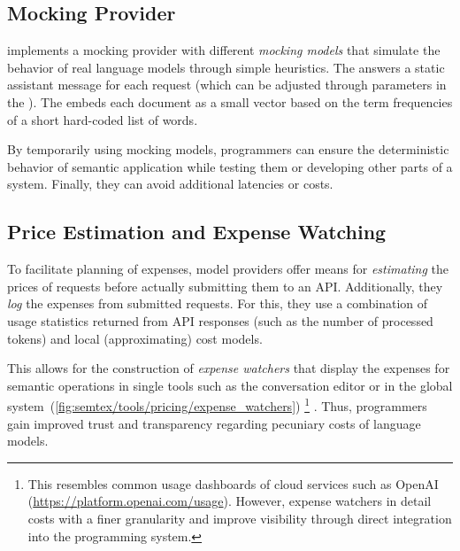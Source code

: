 \subsection*{Mocking Provider}
\label{sec:semtex/tools/mocking}

\semtex implements a mocking provider with different \emph{mocking models} that simulate the behavior of real language models through simple heuristics.
The  answers a static assistant message for each request (which can be adjusted through parameters in the ).
The  embeds each document as a small vector based on the term frequencies of a short hard-coded list of words.

By temporarily using mocking models, programmers can ensure the deterministic behavior of semantic application while testing them or developing other parts of a system.
Finally, they can avoid additional latencies or costs.

\subsection*{Price Estimation and Expense Watching}
\label{sec:semtex/tools/pricing}

To facilitate planning of expenses, model providers offer means for \emph{estimating} the prices of requests before actually submitting them to an API.
Additionally, they \emph{log} the expenses from submitted requests.
For this, they use a combination of usage statistics returned from API responses (such as the number of processed tokens) and local (approximating) cost models.

This allows for the construction of \emph{expense watchers} that display the expenses for semantic operations in single tools such as the conversation editor or in the global system~(\cref{fig:semtex/tools/pricing/expense_watchers})%
\footnote{%
	This resembles common usage dashboards of cloud services such as OpenAI (\url{https://platform.openai.com/usage}).
	However, expense watchers in \semtex detail costs with a finer granularity and improve visibility through direct integration into the programming system.
}%
.
Thus, programmers gain improved trust and transparency regarding pecuniary costs of language models.


